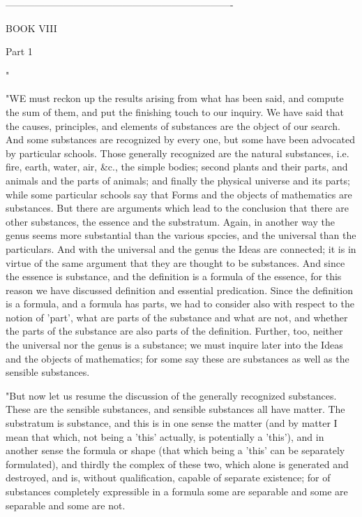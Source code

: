 ----------------------------------------------------------------------

BOOK VIII

Part 1 

"

"WE must reckon up the results arising from what has been said, and
compute the sum of them, and put the finishing touch to our inquiry.
We have said that the causes, principles, and elements of substances
are the object of our search. And some substances are recognized by
every one, but some have been advocated by particular schools. Those
generally recognized are the natural substances, i.e. fire, earth,
water, air, &c., the simple bodies; second plants and their parts,
and animals and the parts of animals; and finally the physical universe
and its parts; while some particular schools say that Forms and the
objects of mathematics are substances. But there are arguments which
lead to the conclusion that there are other substances, the essence
and the substratum. Again, in another way the genus seems more substantial
than the various spccies, and the universal than the particulars.
And with the universal and the genus the Ideas are connected; it is
in virtue of the same argument that they are thought to be substances.
And since the essence is substance, and the definition is a formula
of the essence, for this reason we have discussed definition and essential
predication. Since the definition is a formula, and a formula has
parts, we had to consider also with respect to the notion of 'part',
what are parts of the substance and what are not, and whether the
parts of the substance are also parts of the definition. Further,
too, neither the universal nor the genus is a substance; we must inquire
later into the Ideas and the objects of mathematics; for some say
these are substances as well as the sensible substances.

"But now let us resume the discussion of the generally recognized
substances. These are the sensible substances, and sensible substances
all have matter. The substratum is substance, and this is in one sense
the matter (and by matter I mean that which, not being a 'this' actually,
is potentially a 'this'), and in another sense the formula or shape
(that which being a 'this' can be separately formulated), and thirdly
the complex of these two, which alone is generated and destroyed,
and is, without qualification, capable of separate existence; for
of substances completely expressible in a formula some are separable
and some are separable and some are not. 

